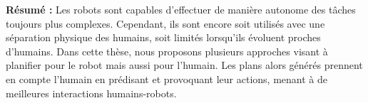 \documentclass[english,a4paper,11pt,twoside]{StyleThese}
\begin{document}
\begin{vcenterpage}
\begin{comment}
In this thesis we show why it is crucial for a robot not only to plan for itself but also for the nearby human in order to predict, elicit and guide human decisions and actions. 
First, we prove, through a user study, planning both for the robot and the human trajectories is important to make a successful and efficient crossing with a human in a narrow corridor. The resulting robot trajectory are not only more acceptable to the human but also allows for the robot to communicate about the proposed collaborative plan.
Secondly, we alleviate from inherent complexity and ephemeral nature of collaborative motion planning to propose a method for planning communication in human robot task planning. An novel approach for referring expression generation is described and shown to be the most computationally efficient method to date while being designed for human robot interaction scenarios. This algorithm is then integrated in a human robot task planner: the Hierarchical Agent-base Task Planner (HATP), enabling for the estimation of the feasibility and the cost of communication actions by resolving their content during task planning. 
Finally, we introduce a new task planning scheme reasoning on separate human and robot beliefs and action domains. By exploring two HTNs corresponding respectively to the planning domain of the robot and the task model of the human, the planner is able to predict and elicit human actions by emulating their decision and reaction processes. The pertinence of the scheme is showed on example and a more complete challenging task is presented: the director task.
\end{comment}

\textbf{Résumé :}
Les robots sont capables d'effectuer de manière autonome des tâches toujours plus complexes. Cependant, ils sont encore soit utilisés avec une séparation physique des humains, soit limités lorsqu'ils évoluent proches d'humains. Dans cette thèse, nous proposons plusieurs approches visant à planifier pour le robot mais aussi pour l'humain. Les plans alors générés prennent en compte l'humain en prédisant et provoquant leur actions, menant à de meilleures interactions humains-robots.


\end{vcenterpage}
\end{document}
